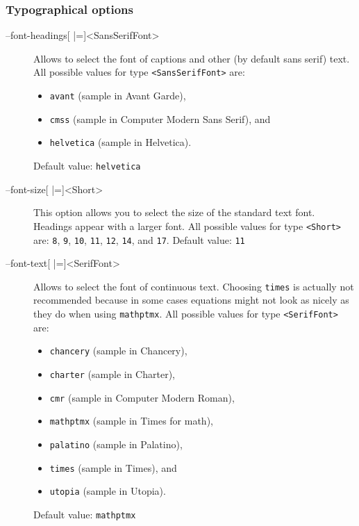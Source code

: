\subsubsection{Typographical options}
\begin{description}
\item[--font-headings{[} |={]}<SansSerifFont>]
  Allows to select the font of captions and other (by default sans
  serif) text.
  All possible values for type \texttt{<SansSerifFont>} are:
  \begin{itemize}
  \item\texttt{avant} {\selectfont (sample in Avant Garde)},
  \item\texttt{cmss} {\selectfont (sample in Computer Modern Sans Serif)}, and
  \item\texttt{helvetica} {\selectfont (sample in Helvetica)}.
  \end{itemize}
  Default value: \texttt{helvetica}

\item[--font-size{[} |={]}<Short>]
  This option allows you to select the size of the standard text
  font. Headings appear with a larger font.
  All possible values for type \texttt{<Short>} are:
  \texttt{8}, \texttt{9}, \texttt{10}, \texttt{11}, \texttt{12}, \texttt{14},
  and \texttt{17}.
  Default value: \texttt{11}

\item[--font-text{[} |={]}<SerifFont>]
  Allows to select the font of continuous text. Choosing \texttt{times}
  is actually not recommended because in some cases equations
  might not look as nicely as they do when using \texttt{mathptmx}.
  All possible values for type \texttt{<SerifFont>} are:
  \begin{itemize}
  \item\texttt{chancery} {\selectfont (sample in Chancery)},
  \item\texttt{charter}  {\selectfont (sample in Charter)},
  \item\texttt{cmr}  {\selectfont (sample in Computer Modern Roman)},
  \item\texttt{mathptmx}  {\selectfont (sample in Times for math)},
  \item\texttt{palatino}  {\selectfont (sample in Palatino)},
  \item\texttt{times}  {\selectfont (sample in Times)}, and
  \item\texttt{utopia}  {\selectfont (sample in Utopia)}.
  \end{itemize}
  Default value: \texttt{mathptmx}


\end{description}
